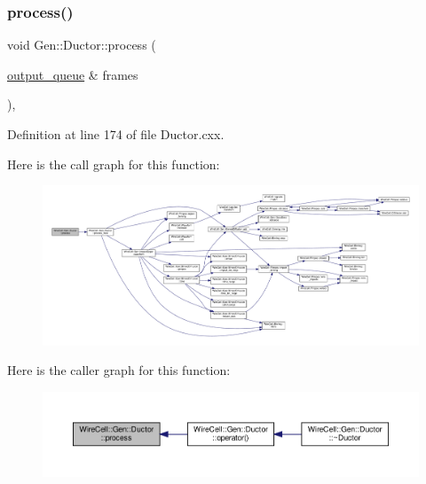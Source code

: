 \subsubsection{\texorpdfstring{process()}{process()}}
{\footnotesize\ttfamily void Gen\+::\+Ductor\+::process (\begin{DoxyParamCaption}\item[{\hyperlink{class_wire_cell_1_1_i_queuedout_node_a39018e4e3dd886befac9636ac791a685}{output\+\_\+queue} \&}]{frames }\end{DoxyParamCaption})\hspace{0.3cm}{\ttfamily [protected]}, {\ttfamily [virtual]}}



Definition at line 174 of file Ductor.\+cxx.

Here is the call graph for this function\+:
\nopagebreak
\begin{figure}[H]
\begin{center}
\leavevmode
\includegraphics[width=350pt]{class_wire_cell_1_1_gen_1_1_ductor_a1454baebba2e385dea9cd098236dd515_cgraph}
\end{center}
\end{figure}
Here is the caller graph for this function\+:
\nopagebreak
\begin{figure}[H]
\begin{center}
\leavevmode
\includegraphics[width=350pt]{class_wire_cell_1_1_gen_1_1_ductor_a1454baebba2e385dea9cd098236dd515_icgraph}
\end{center}
\end{figure}
\mbox{\label{class_wire_cell_1_1_gen_1_1_ductor_afec4558613941dc3bb752a3811aadd3d}} 
